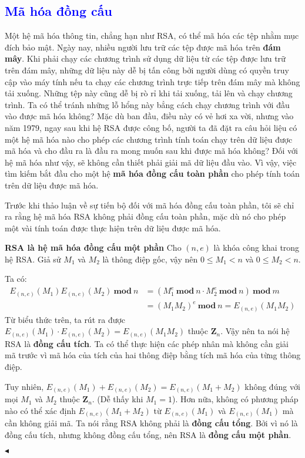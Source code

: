 \textcolor{blue}{\section{Mã hóa đồng cấu}}
Một hệ mã hóa thông tin, chẳng hạn như RSA, có thể mã hóa các tệp
nhằm mục đích bảo mật. Ngày nay, nhiều người lưu trữ các tệp được mã
hóa trên \textbf{đám mây}. Khi phải chạy các
chương trình sử dụng dữ liệu từ các tệp được lưu trữ trên đám mây, những dữ liệu
này dễ bị tấn công bởi người dùng có quyền truy cập vào máy tính nếu ta chạy các chương trình trực tiếp trên đám mây
mà không tải xuống. Những tệp này cũng dễ bị rò rỉ khi tải xuống, tải lên và chạy chương trình.
Ta có thể tránh những lỗ hổng này bẳng cách chạy chương trình với đầu vào được mã hóa không?
Mặc dù ban đầu, điều này có vẻ hơi xa vời, nhưng vào năm 1979, ngay sau khi hệ RSA
được công bố, người ta đã đặt ra câu hỏi liệu có một hệ mã hóa nào cho phép
các chương trình tính toán chạy trên dữ liệu được mã hóa và cho đầu ra là đầu ra mong muốn sau khi được mã hóa
không?
Đối với hệ mã hóa như vậy, sẽ không cần thiết phải giải mã dữ liệu đầu vào.
Vì vậy, việc tìm kiếm bắt đầu cho một hệ \textbf{mã hóa đồng cấu toàn phần} cho
phép tính toán trên dữ liệu được mã hóa.

Trước khi thảo luận về sự tiến bộ đối với mã hóa đồng cấu toàn phần, tôi
sẽ chỉ ra rằng hệ mã hóa RSA không phải đồng cấu toàn phần, mặc dù nó cho phép
một vài tính toán được thực hiện trên dữ liệu được mã hóa.

\begin{example}
    \textbf{RSA là hệ mã hóa đồng cấu một phần} Cho $(n,e)$ là khóa công khai trong hệ RSA. Giả sử $M_1$ và $M_2$ là thông điệp gốc, vậy nên $0\leq M_1 <n$ và $0\leq M_2 <n$.

    Ta có:
    \begin{align*}
        E_{(n,e)}(M_1) E_{(n,e)}(M_2)\ \mathbf{mod}\ n & =  (M_1^e\ \mathbf{mod}\ n \cdot M_2^e\ \mathbf{mod}\ n)\ \mathbf{mod}\ m \\
                                                       & =  (M_1M_2)^e\ \mathbf{mod}\ n = E_{(n,e)}(M_1M_2)
    \end{align*}
    Từ biểu thức trên, ta rút ra được $E_{(n,e)}(M_1)\cdot E_{(n,e)}(M_2) = E_{(n,e)}(M_1M_2)$ thuộc $\mathbf{Z}_n$.
    Vậy nên ta nói hệ RSA là \textbf{đồng cấu tích}.
    Ta có thể thực hiện các phép nhân mà không cần giải mã trước vì
    mã hóa của tích của hai thông điệp bằng tích mã hóa của từng thông điệp.

    Tuy nhiên, $E_{(n,e)}(M_1) + E_{(n,e)}(M_2) = E_{(n,e)}(M_1+M_2)$ không đúng với mọi $M_1$ và $M_2$ thuộc $\mathbf{Z}_n$.
    (Dễ thấy khi $M_1=1$).
    Hơn nữa, không có phương pháp nào có thể xác định $E_{(n,e)}(M_1+M_2)$ từ $E_{(n,e)}(M_1)$ và $E_{(n,e)}(M_1)$ mà cần không giải mã.
    Ta nói rằng RSA không phải là \textbf{đồng cấu tổng}. Bởi vì nó là đồng
    cấu tích, nhưng không đồng cấu tổng, nên RSA là \textbf{đồng cấu một phần}.
    \begin{flushright}
        $\blacktriangleleft$
    \end{flushright}
\end{example}


